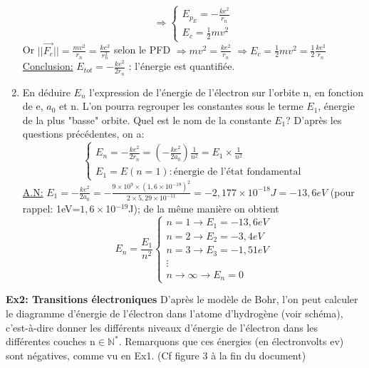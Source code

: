 \documentclass{article}
\begin{document}
\begin{enumerate}
\[    \Longrightarrow
    \left\{ \begin{array}{l}
        E_{p_{E}} = -\frac{ke^{2}}{r_{n}} \\
        E_{c} = \frac{1}{2}mv^{2}
    \end{array}
    \]
    Or $||\overrightarrow{F_{e}}||=\frac{mv^{2}}{r_{n}}=\frac{ke^{2}}{r_{n}^{2}}$ selon le PFD $\Longrightarrow mv^{2}=\frac{ke^{2}}{r_{n}}$\newline
    $\Longrightarrow E_{c}=\frac{1}{2}mv^{2}=\frac{1}{2}\frac{ke^{2}}{r_{n}}$\newline
    \underline{Conclusion:} $E_{tot}=-\frac{ke^{2}}{2r_{n}}$ : l'énergie est quantifiée.
    \item En déduire $E_{n}$ l'expression de l'énergie de l'électron sur l'orbite n, en fonction de e, $a_{0}$ et n. L'on pourra regrouper les constantes sous le terme $E_{1}$, énergie de la plus "basse" orbite. Quel est le nom de la constante $E_{1}$?\newline
    D'après les questions précédentes, on a:
    \[\left\{
        \begin{array}{l}
            E_{n}=-\frac{ke^{2}}{2r_{n}} = \left(-\frac{ke^{2}}{2a_{0}}\right)\frac{1}{n^{2}} = E_{1}\times\frac{1}{n^{2}} \\
            E_{1} = E(n=1): \text{énergie de l'état fondamental}
        \end{array}
    \]
    \underline{A.N:} $E_{1}=-\frac{ke^{2}}{2a_{0}} = -\frac{9\times 10^{9}\times (1,6\times 10^{-19})^{2}}{2\times 5,29\times 10^{-11}} = -2,177\times 10^{-18}J = -13,6eV$\newline
    (pour rappel: 1eV=$1,6\times$10$^{-19}$J); de la même manière on obtient
    \[E_{n}=\frac{E_{1}}{n^{2}}\left\{
        \begin{array}{l}
            n=1 \rightarrow E_{1} = -13,6eV \\
            n=2 \rightarrow E_{2} = -3,4eV \\
            n=3 \rightarrow E_{3} = -1,51eV \\
            \vdots \\
            n\to\infty \rightarrow E_{n} = 0
        \end{array}
    \]
\end{enumerate}
\newpage
\textbf{Ex2: Transitions électroniques}\newline
\indent D'après le modèle de Bohr, l'on peut calculer le diagramme d'énergie de l'électron dans l'atome d'hydrogène (voir schéma), c'est-à-dire donner les différents niveaux d'énergie de l'électron dans les différentes couches n$\in\mathbb{N^{*}}$. Remarquons que ces énergies (en électronvolts ev) sont négatives, comme vu en Ex1.\newline
(Cf figure 3 à la fin du document)
\end{document}
